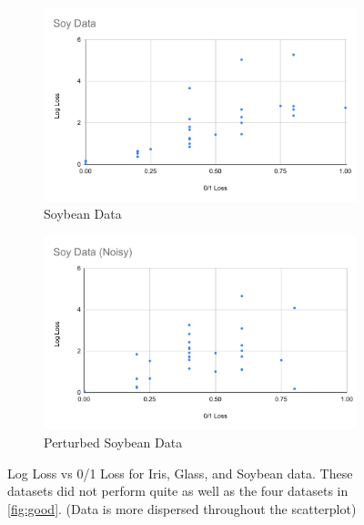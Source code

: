 \documentclass[twoside,11pt]{article}
\begin{document}
\begin{figure}[h!]
   \begin{subfigure}[b]{0.45\linewidth}
    \includegraphics[width=\linewidth]{images/Soy.pdf}
    \caption{Soybean Data}
  \end{subfigure}
  \begin{subfigure}[b]{0.45\linewidth}
    \includegraphics[width=\linewidth]{images/Soy(noise).pdf}
    \caption{Perturbed Soybean Data}
  \end{subfigure}
  
  \caption{Log Loss vs 0/1 Loss for Iris, Glass, and Soybean data. These datasets did not perform quite as well as the four datasets in \ref{fig:good}. (Data is more dispersed throughout the scatterplot)}
  \label{fig:ugly}
\end{figure}




\vskip 0.2in

\end{document}
